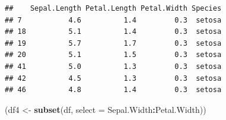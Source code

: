 \documentclass[
]{book}
\newenvironment{Shaded}{\begin{snugshade}}{\end{snugshade}}
\newcommand{\AttributeTok}[1]{\textcolor[rgb]{0.13,0.29,0.53}{#1}}
\newcommand{\FunctionTok}[1]{\textcolor[rgb]{0.13,0.29,0.53}{\textbf{#1}}}
\newcommand{\NormalTok}[1]{#1}
\newcommand{\OtherTok}[1]{\textcolor[rgb]{0.56,0.35,0.01}{#1}}
\newcommand{\SpecialCharTok}[1]{\textcolor[rgb]{0.81,0.36,0.00}{\textbf{#1}}}
\begin{document}
\begin{verbatim}
##    Sepal.Length Petal.Length Petal.Width Species
## 7           4.6          1.4         0.3  setosa
## 18          5.1          1.4         0.3  setosa
## 19          5.7          1.7         0.3  setosa
## 20          5.1          1.5         0.3  setosa
## 41          5.0          1.3         0.3  setosa
## 42          4.5          1.3         0.3  setosa
## 46          4.8          1.4         0.3  setosa
\end{verbatim}

\begin{Shaded}
\begin{Highlighting}[]
\NormalTok{(df4 }\OtherTok{\textless{}{-}} \FunctionTok{subset}\NormalTok{(df, }\AttributeTok{select =}\NormalTok{ Sepal.Width}\SpecialCharTok{:}\NormalTok{Petal.Width))}
\end{Highlighting}
\end{Shaded}
\end{document}
